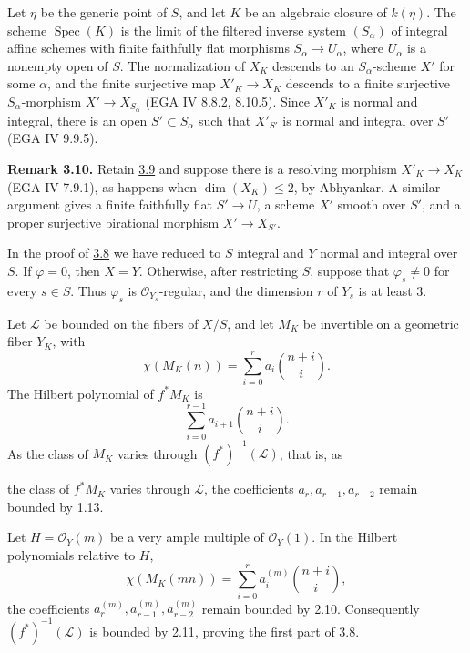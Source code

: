 Let \(\eta\) be the generic point of \(S\), and let \(K\) be an algebraic
closure of \(k(\eta)\). The scheme \(\operatorname{Spec}(K)\) is the
limit of the filtered inverse system \((S_\alpha)\) of integral affine
schemes with finite faithfully flat morphisms
\(S_\alpha\to U_\alpha\), where \(U_\alpha\) is a nonempty open of \(S\).
The normalization of \(X_K\) descends to an \(S_\alpha\)-scheme \(X'\) for
some \(\alpha\), and the finite surjective map \(X'_K\to X_K\) descends
to a finite surjective \(S_\alpha\)-morphism \(X'\to X_{S_\alpha}\)
(EGA IV 8.8.2, 8.10.5). Since \(X'_K\) is normal and integral, there is
an open \(S'\subset S_\alpha\) such that \(X'_{S'}\) is normal and
integral over \(S'\) (EGA IV 9.9.5).

\textbf{Remark 3.10.} Retain \hyperlink{sga6.e13.lem.3-9}{3.9} and suppose there is a resolving
morphism \(X'_K\to X_K\) (EGA IV 7.9.1), as happens when
\(\dim(X_K)\le2\), by Abhyankar. A similar argument gives a finite
faithfully flat \(S'\to U\), a scheme \(X'\) smooth over \(S'\), and a
proper surjective birational morphism \(X'\to X_{S'}\).

In the proof of \hyperlink{sga6.e13.thm.3-8}{3.8} we have reduced to \(S\) integral and \(Y\) normal and
integral over \(S\). If \(\varphi=0\), then \(X=Y\). Otherwise, after
restricting \(S\), suppose that \(\varphi_s\ne0\) for every \(s\in S\).
Thus \(\varphi_s\) is \(\mathcal O_{Y_s}\)-regular, and the dimension
\(r\) of \(Y_s\) is at least \(3\).

Let \(\mathscr L\) be bounded on the fibers of \(X/S\), and let \(M_K\)
be invertible on a geometric fiber \(Y_K\), with
\[
\chi(M_K(n))=\sum_{i=0}^{r}a_i\binom{n+i}{i}.
\]
The Hilbert polynomial of \(f^*M_K\) is
\[
\sum_{i=0}^{r-1}a_{i+1}\binom{n+i}{i}.
\]
As the class of \(M_K\) varies through \((f^*)^{-1}(\mathscr L)\), that
is, as

the class of \(f^*M_K\) varies through \(\mathscr L\), the coefficients
\(a_r,a_{r-1},a_{r-2}\) remain bounded by 1.13.

Let \(H=\mathcal O_Y(m)\) be a very ample multiple of
\(\mathcal O_Y(1)\). In the Hilbert polynomials relative to \(H\),
\[
\chi(M_K(mn))=\sum_{i=0}^{r}a_i^{(m)}\binom{n+i}{i},
\]
the coefficients \(a_r^{(m)},a_{r-1}^{(m)},a_{r-2}^{(m)}\) remain bounded
by 2.10. Consequently \((f^*)^{-1}(\mathscr L)\) is bounded by \hyperlink{sga6.e13.lem.2-11}{2.11},
proving the first part of 3.8.

